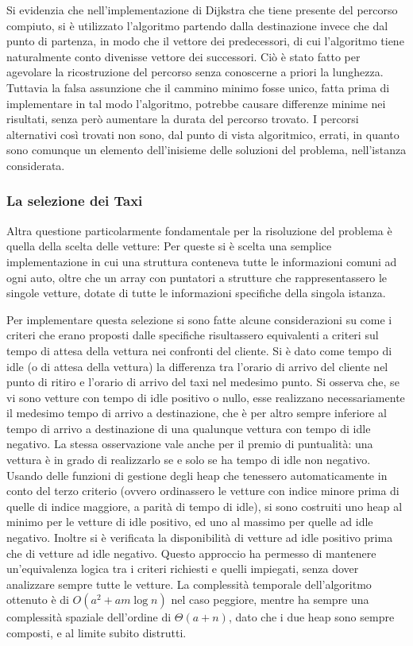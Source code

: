 \documentclass[a4paper,11pt]{Article}
\begin{document}
Si evidenzia che nell'implementazione di Dijkstra che tiene presente del percorso compiuto, si è utilizzato l'algoritmo partendo dalla destinazione invece che dal punto di partenza, in modo che il vettore dei predecessori, di cui l'algoritmo tiene naturalmente conto divenisse vettore dei successori. Ciò è stato fatto per agevolare la ricostruzione del percorso senza conoscerne a priori la lunghezza.
Tuttavia la falsa assunzione che il cammino minimo fosse unico, fatta prima di implementare in tal modo l'algoritmo, potrebbe causare differenze minime nei risultati, senza però aumentare la durata del percorso trovato. I percorsi alternativi così trovati non sono, dal punto di vista algoritmico, errati, in quanto sono comunque un elemento dell'inisieme delle soluzioni del problema, nell'istanza considerata.

\subsubsection{La selezione dei Taxi}

Altra questione particolarmente fondamentale per la risoluzione del problema è quella della scelta delle vetture: Per queste si è scelta una semplice implementazione in cui una struttura conteneva tutte le informazioni comuni ad ogni auto, oltre che un array con puntatori a strutture che rappresentassero le singole vetture, dotate di tutte le informazioni specifiche della singola istanza.

Per implementare questa selezione si sono fatte alcune considerazioni su come i criteri che erano proposti dalle specifiche risultassero equivalenti a criteri sul tempo di attesa della vettura nei confronti del cliente.
Si è dato come tempo di idle (o di attesa della vettura) la differenza tra l'orario di arrivo del cliente nel punto di ritiro e l'orario di arrivo del taxi nel medesimo punto.
Si osserva che, se vi sono vetture con tempo di idle positivo o nullo, esse realizzano necessariamente il medesimo tempo di arrivo a destinazione, che è per altro sempre inferiore al tempo di arrivo a destinazione di una qualunque vettura con tempo di idle negativo. La stessa osservazione vale anche per il premio di puntualità: una vettura è in grado di realizzarlo se e solo se ha tempo di idle non negativo.
Usando delle funzioni di gestione degli heap che tenessero automaticamente in conto del terzo criterio (ovvero ordinassero le vetture con indice minore prima di quelle di indice maggiore, a parità di tempo di idle), si sono costruiti uno heap al minimo per le vetture di idle positivo, ed uno al massimo per quelle ad idle negativo.
Inoltre si è verificata la disponibilità di vetture ad idle positivo prima che di vetture ad idle negativo. Questo approccio ha permesso di mantenere un'equivalenza logica tra i criteri richiesti e quelli impiegati, senza dover analizzare sempre tutte le vetture. La complessità temporale dell'algoritmo ottenuto è di $O(a^2 + am\log{n})$ nel caso peggiore, mentre ha sempre una complessità spaziale dell'ordine di $\Theta(a + n)$, dato che i due heap sono sempre composti, e al limite subito distrutti.
\end{document}
